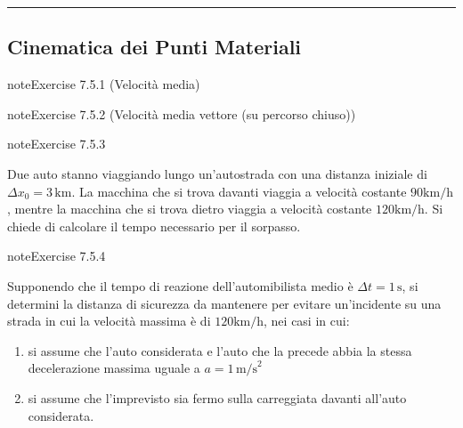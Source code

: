 \documentclass[letterpaper,10pt,italian]{jupyterBook}
\begin{document}
\bigskip\hrule\bigskip



\subsection{Cinematica dei Punti Materiali}
\label{\detokenize{ch/mechanics/kinematics-problems:cinematica-dei-punti-materiali}} \label{exercise:ch/mechanics/kinematics-problems-exercise-0}

\begin{sphinxadmonition}{note}{Exercise 7.5.1 (Velocità media)}



\sphinxAtStartPar
{}
\end{sphinxadmonition}
 \label{exercise:ch/mechanics/kinematics-problems-exercise-1}

\begin{sphinxadmonition}{note}{Exercise 7.5.2 (Velocità media vettore (su percorso chiuso))}



\sphinxAtStartPar
{}
\end{sphinxadmonition}
 \label{exercise:ch/mechanics/kinematics-problems-exercise-2}

\begin{sphinxadmonition}{note}{Exercise 7.5.3}



\sphinxAtStartPar
Due auto stanno viaggiando lungo un’autostrada con una distanza iniziale di \(\Delta x_0 = 3 \, \text{km}\). La macchina che si trova davanti viaggia a velocità costante \(90 \text{km/h}\), mentre la macchina che si trova dietro viaggia a velocità costante \(120 \text{km/h}\). Si chiede di calcolare il tempo necessario per il sorpasso.
\end{sphinxadmonition}
 \label{exercise:ch/mechanics/kinematics-problems-exercise-3}

\begin{sphinxadmonition}{note}{Exercise 7.5.4}



\sphinxAtStartPar
Supponendo che il tempo di reazione dell’automibilista medio è \(\Delta t = 1 \, \text{s}\), si determini la distanza di sicurezza da mantenere per evitare un’incidente su una strada in cui la velocità massima è di \(120 \text{km/h}\), nei casi in cui:
\begin{enumerate}
%
\item {} 
\sphinxAtStartPar
si assume che l’auto considerata e l’auto che la precede abbia la stessa decelerazione massima uguale a \(a = 1 \, \text{m/s}^2\)

\item {} 
\sphinxAtStartPar
si assume che l’imprevisto sia fermo sulla carreggiata davanti all’auto considerata.

\end{enumerate}
\end{sphinxadmonition}
 \label{exercise:ch/mechanics/kinematics-problems-exercise-4}
\end{document}
